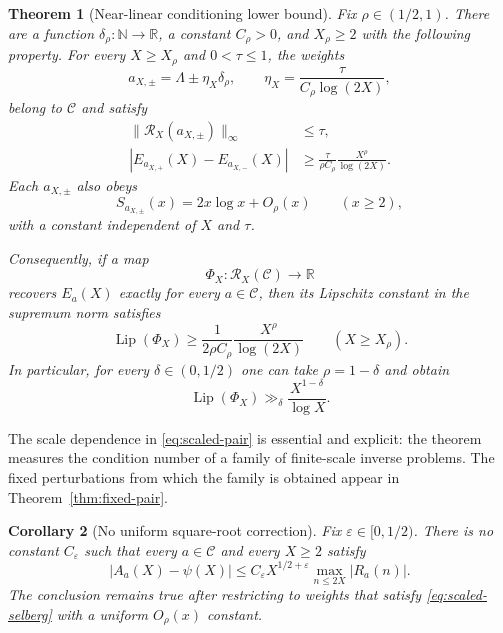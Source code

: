 \documentclass[11pt,a4paper]{amsart}
\newtheorem{theorem}{Theorem}[section]
\newtheorem{corollary}[theorem]{Corollary}
\theoremstyle{definition}
\newcommand{\N}{\mathbb N}
\newcommand{\1}{\mathbf 1}
\begin{document}
\begin{theorem}[Near-linear conditioning lower bound]\label{thm:conditioning}
Fix $\rho\in(1/2,1)$.  There are a function $\delta_\rho:\N\to\mathbb R$, a constant $C_\rho>0$, and $X_\rho\ge2$ with the following property.  For every $X\ge X_\rho$ and $0<\tau\le1$, the weights
\begin{equation}\label{eq:scaled-pair}
  a_{X,\pm}=\Lambda\pm\eta_X\delta_\rho,
  \qquad
  \eta_X=\frac{\tau}{C_\rho\log(2X)},
\end{equation}
belong to $\mathcal C$ and satisfy
\begin{align}
 \|\mathcal R_X(a_{X,\pm})\|_\infty&\le\tau,\label{eq:input-bound}\\
 |E_{a_{X,+}}(X)-E_{a_{X,-}}(X)|
 &\ge \frac{\tau}{\rho C_\rho}\frac{X^\rho}{\log(2X)}.\label{eq:output-separation}
\end{align}
Each $a_{X,\pm}$ also obeys
\begin{equation}\label{eq:scaled-selberg}
  S_{a_{X,\pm}}(x)=2x\log x+O_\rho(x)
  \qquad(x\ge2),
\end{equation}
with a constant independent of $X$ and $\tau$.

Consequently, if a map
\[
 \Phi_X:\mathcal R_X(\mathcal C)\longrightarrow\mathbb R
\]
recovers $E_a(X)$ exactly for every $a\in\mathcal C$, then its Lipschitz constant in the supremum norm satisfies
\begin{equation}\label{eq:lipschitz-lower}
  \operatorname{Lip}(\Phi_X)
  \ge \frac{1}{2\rho C_\rho}\frac{X^\rho}{\log(2X)}
  \qquad(X\ge X_\rho).
\end{equation}
In particular, for every $\delta\in(0,1/2)$ one can take $\rho=1-\delta$ and obtain
\[
  \operatorname{Lip}(\Phi_X)\gg_\delta
  \frac{X^{1-\delta}}{\log X}.
\]
\end{theorem}

The scale dependence in \eqref{eq:scaled-pair} is essential and explicit: the theorem measures the condition number of a family of finite-scale inverse problems.  The fixed perturbations from which the family is obtained appear in Theorem~\ref{thm:fixed-pair}.

\begin{corollary}[No uniform square-root correction]\label{cor:sqrt}
Fix $\varepsilon\in[0,1/2)$.  There is no constant $C_\varepsilon$ such that every $a\in\mathcal C$ and every $X\ge2$ satisfy
\begin{equation}\label{eq:forbidden-bound}
 |A_a(X)-\psi(X)|
 \le C_\varepsilon X^{1/2+\varepsilon}
 \max_{n\le2X}|R_a(n)|.
\end{equation}
The conclusion remains true after restricting to weights that satisfy \eqref{eq:scaled-selberg} with a uniform $O_\rho(x)$ constant.
\end{corollary}
\end{document}
